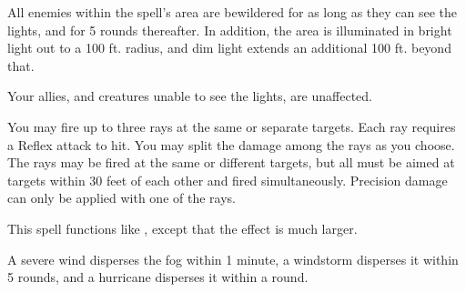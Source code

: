 \spelldur{\durshort}
\begin{spelleffect}
  All enemies within the spell's area are bewildered for as long as they can see the lights, and for 5 rounds thereafter. In addition, the area is illuminated in bright light out to a 100 ft. radius, and dim light extends an additional 100 ft. beyond that.
\end{spelleffect}
\begin{spellnotes}
   Your allies, and creatures unable to see the lights, are unaffected.
\end{spellnotes}

\spellrng{\rngclose}
\begin{spelleffect}
  You may fire up to three rays at the same or separate targets. Each ray requires a Reflex attack to hit. You may split the damage among the rays as you choose. The rays may be fired at the same or different targets, but all must be aimed at targets within 30 feet of each other and fired simultaneously. Precision damage can only be applied with one of the rays.
\end{spelleffect}

\begin{spelleffect}
  This spell functions like , except that the effect is much larger.
\end{spelleffect}
\begin{spellnotes}
  A severe wind disperses the fog within 1 minute, a windstorm disperses it within 5 rounds, and a hurricane disperses it within a round.
\end{spellnotes}

